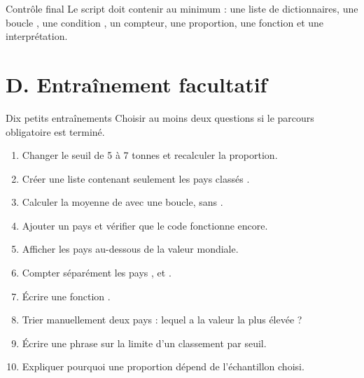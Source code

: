 \documentclass[11pt,a4paper]{article}
\begin{document}
\begin{mandatoryexercise}{Contrôle final}
Le script doit contenir au minimum : une liste de dictionnaires, une boucle , une condition , un compteur, une proportion, une fonction et une interprétation.
\end{mandatoryexercise}

\section*{D. Entraînement facultatif}

\begin{extensionexercise}{Dix petits entraînements}
Choisir au moins deux questions si le parcours obligatoire est terminé.
\begin{enumerate}
  \item Changer le seuil de 5 à 7 tonnes et recalculer la proportion.
  \item Créer une liste contenant seulement les pays classés .
  \item Calculer la moyenne de  avec une boucle, sans .
  \item Ajouter un pays et vérifier que le code fonctionne encore.
  \item Afficher les pays au-dessous de la valeur mondiale.
  \item Compter séparément les pays ,  et .
  \item Écrire une fonction .
  \item Trier manuellement deux pays : lequel a la valeur la plus élevée ?
  \item Écrire une phrase sur la limite d'un classement par seuil.
  \item Expliquer pourquoi une proportion dépend de l'échantillon choisi.
\end{enumerate}
\end{extensionexercise}
\end{document}
